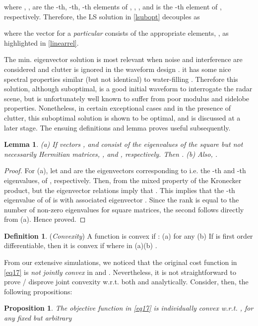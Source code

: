 \documentclass[11pt,draftclsnofoot,onecolumn]{IEEEtran}
\newtheorem{prop}{\bf{Proposition}}
\newtheorem{lem}{\bf {Lemma}}
\theoremstyle{definition}
\newtheorem{defn}{\bf Definition}
\theoremstyle{remark}
\begin{document}
where , ,  are the -th, -th, -th elements of , , , and  is the -th element of , respectively. Therefore, the LS solution in \eqref{lsubopt} decouples as

where the vector  for a {\it particular } consists of the  appropriate elements, , as highlighted in \eqref{linearrel}.

The min. eigenvector solution is most relevant when noise and interference are considered and clutter is ignored in the waveform design \cite{guerci2003}. it has some nice spectral properties  similar (but not identical) to water-filling \cite{guerci2003,bell1993information}. Therefore this solution, although suboptimal, is a good initial waveform to  interrogate the radar scene, but is unfortunately well known to suffer from poor modulus and sidelobe properties. Nonetheless, in certain exceptional cases and in the presence of clutter, this suboptimal solution is shown to be optimal, and is discussed at a later stage. The ensuing definitions and lemma proves useful subsequently.
\begin{lem} \label{lemma1}
(a) If vectors ,  and  consist of the eigenvalues of the square but not necessarily Hermitian matrices, ,  and , respectively. Then . (b) Also,  .
\end{lem}

\begin{proof}
For (a), let   and  are the eigenvectors corresponding to  i.e. the -th and -th eigenvalues, of , respectively. Then, from the mixed property of the Kronecker product,  but the eigenvector relations imply that . This implies that the -th eigenvalue of of  is   with associated eigenvector . Since the rank is equal to the number of non-zero eigenvalues for square matrices, the second follows directly from (a). Hence proved.
\end{proof}

\begin{defn}\label{mydef1} ({\it Convexity})
 A function  is convex if : \newline
(a)  for any  \newline
(b) If  is first order differentiable, then it is convex if  \newline
where  in (a)(b) .
\end{defn}

From our extensive simulations, we noticed that the original cost function in \eqref{eq17} is {\it not jointly convex} in  and . Nevertheless, it is not straightforward to prove / disprove joint convexity w.r.t. both  and  analytically. Consider, then, the following propositions:
\begin{prop} \label{propos1}
The objective function in \eqref{eq17} is individually convex w.r.t. , for any fixed but arbitrary 
\end{prop}
\end{document}

